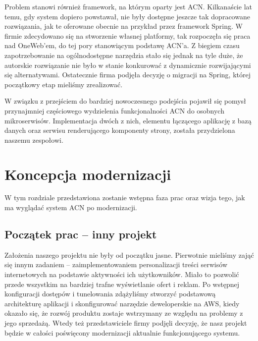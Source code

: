 \documentclass[licencjacka]{pracamgr}
\begin{document}
\vspace{1mm}

Problem stanowi również framework, na którym oparty jest ACN. Kilkanaście lat temu, gdy system dopiero powstawał, nie były dostępne jeszcze tak dopracowane rozwiązania, jak te oferowane obecnie na przykład przez framework Spring. W firmie zdecydowano się na stworzenie własnej platformy, tak rozpoczęła się praca nad OneWeb'em, do tej pory stanowiącym podstawę ACN'a. Z biegiem czasu zapotrzebowanie na ogólnodostępne narzędzia stało się jednak na tyle duże, że autorskie rozwiązanie nie było w stanie konkurować z dynamicznie rozwijającymi się alternatywami. Ostatecznie firma podjęła decyzję o migracji na Spring, której początkowy etap mieliśmy zrealizować.

\vspace{1mm}

W związku z przejściem do bardziej nowoczesnego podejścia pojawił się pomysł przynajmniej częściowego wydzielenia funkcjonalności ACN do osobnych mikroserwisów. Implementacja dwóch z nich, elementu łączącego aplikację z bazą danych oraz serwisu renderującego komponenty strony, została przydzielona naszemu zespołowi.

\chapter{Koncepcja modernizacji}

W tym rozdziale przedstawiona zostanie wstępna faza prac oraz wizja tego, jak ma wyglądać system ACN po modernizacji.
	
\section{Początek prac – inny projekt}

Założenia naszego projektu nie były od początku jasne. Pierwotnie mieliśmy zająć się innym zadaniem – zaimplementowaniem personalizacji treści serwisów internetowych na podstawie aktywności ich użytkowników. Miało to pozwolić przede wszystkim na bardziej trafne wyświetlanie ofert i reklam. Po wstępnej konfiguracji dostępów i tunelowania zdążyliśmy stworzyć podstawową architekturę aplikacji i skonfigurować narzędzie deweloperskie na AWS, kiedy okazało się, że rozwój produktu zostaje wstrzymany ze względu na problemy z jego sprzedażą. Wtedy też przedstawiciele firmy podjęli decyzję, że nasz projekt będzie w całości poświęcony modernizacji aktualnie funkcjonującego systemu. 
\end{document}
